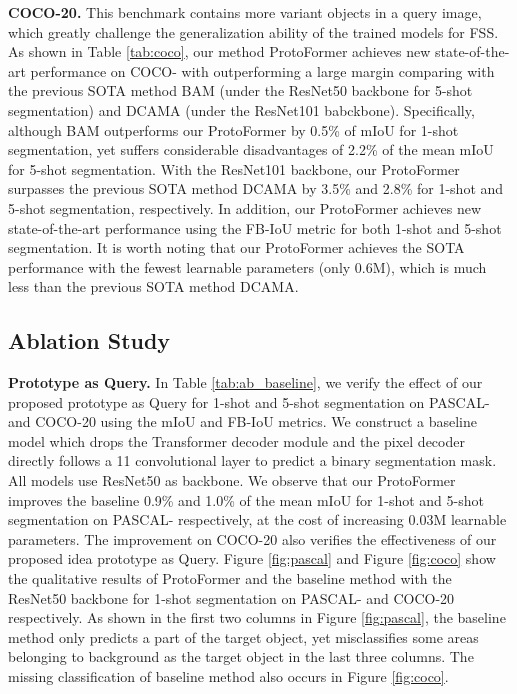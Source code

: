 \documentclass[journal]{IEEEtran}
\begin{document}
\noindent \textbf{COCO-20.}
This benchmark contains more variant objects in a query image, which greatly challenge the generalization ability of the trained models for FSS. As shown in Table \ref{tab:coco}, our method ProtoFormer achieves new state-of-the-art performance on COCO- with outperforming a large margin comparing with the previous SOTA method BAM (under the ResNet50 backbone for 5-shot segmentation) and DCAMA (under the ResNet101 babckbone). Specifically, although BAM outperforms our ProtoFormer by 0.5\% of mIoU for 1-shot segmentation, yet suffers considerable disadvantages of 2.2\% of the mean mIoU for 5-shot segmentation. With the ResNet101 backbone, our ProtoFormer surpasses the previous SOTA method DCAMA by 3.5\% and 2.8\% for 1-shot and 5-shot segmentation, respectively. In addition, our ProtoFormer achieves new state-of-the-art performance using the FB-IoU metric for both 1-shot and 5-shot segmentation. It is worth noting that our ProtoFormer achieves the SOTA performance with the fewest learnable parameters (only 0.6M), which is much less than the previous SOTA method DCAMA.

\subsection{Ablation Study}
\noindent \textbf{Prototype as Query.}
In Table \ref{tab:ab_baseline}, we verify the effect of our proposed prototype as Query for 1-shot and 5-shot segmentation on PASCAL- and COCO-20 using the mIoU and FB-IoU metrics. We construct a baseline model which drops the Transformer decoder module and the pixel decoder directly follows a 11 convolutional layer to predict a binary segmentation mask. All models use ResNet50 as backbone. We observe that our ProtoFormer improves the baseline 0.9\% and 1.0\% of the mean mIoU for 1-shot and 5-shot segmentation on PASCAL- respectively, at the cost of increasing 0.03M learnable parameters. The improvement on COCO-20 also verifies the effectiveness of our proposed idea prototype as Query. Figure \ref{fig:pascal} and Figure  \ref{fig:coco} show the qualitative results of ProtoFormer and the baseline method with the ResNet50 backbone for 1-shot segmentation on PASCAL- and COCO-20 respectively. As shown in the first two columns in Figure \ref{fig:pascal}, the baseline method only predicts a part of the target object, yet misclassifies some areas belonging to background as the target object in the last three columns. The missing classification of baseline method also occurs in Figure \ref{fig:coco}.
\end{document}

